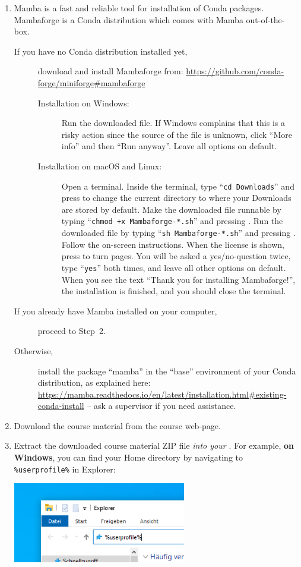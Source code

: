 \documentclass[12pt,a4paper]{article}
\begin{document}
\begin{enumerate}
\item Mamba is a fast and reliable tool for installation of Conda packages. Mambaforge is a Conda distribution which comes with Mamba out-of-the-box.
    \begin{description}
        \item[If you have no Conda distribution installed yet,] download and install Mamba\-forge from: \url{https://github.com/conda-forge/miniforge#mambaforge}
        \begin{description}
            \item[Installation on Windows:] Run the downloaded file. If Windows complains that this is a risky action since the source of the file is unknown, click ``More info'' and then ``Run anyway''. Leave all options on default.
            \item[Installation on macOS and Linux:] Open a terminal. Inside the terminal, type ``\texttt{cd Downloads}'' and press \Return to change the current directory to where your Downloads are stored by default. Make the downloaded file runnable by typing ``\texttt{chmod +x Mambaforge-*.sh}'' and pressing \Return. Run the downloaded file by typing ``\texttt{sh Mambaforge-*.sh}'' and pressing \Return. Follow the on-screen instructions. When the license is shown, press \Spacebar to turn pages. You will be asked a yes/no-question twice, type ``\texttt{yes}'' both times, and leave all other options on default. When you see the text ``Thank you for installing Mambaforge!'', the installation is finished, and you should close the terminal.
        \end{description}
        \item[If you already have Mamba installed on your computer,] proceed to Step~2.
        \item[Otherwise,] install the package ``mamba'' in the ``base'' environment of your Conda distribution, as explained here: \url{https://mamba.readthedocs.io/en/latest/installation.html#existing-conda-install} -- ask a supervisor if you need assistance.
    \end{description}
\item Download the course material from the course web-page.
\item Extract the downloaded course material ZIP file \emph{\underline{} into your \underline{}}. \underline{} For example, \textbf{on Windows}, you can find your Home directory by navigating to \texttt{\%userprofile\%} in Explorer:\\[0.5em]
    \begin{minipage}{\linewidth}
        \centering
        \includegraphics[height=35mm]{images/userprofile.png}
    \end{minipage}
    

\end{enumerate}
\end{document}
